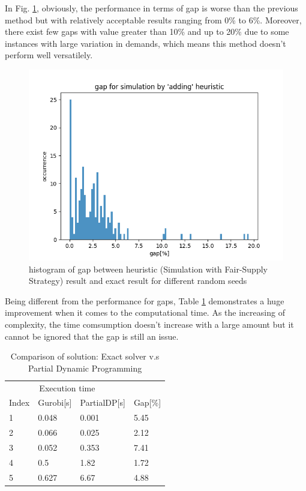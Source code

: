 \documentclass{article}
\begin{document}
In Fig. \ref{fig:hist_so}, obviously, the performance in terms of gap is worse than the previous method but with relatively acceptable results ranging from 0\% to 6\%. Moreover, there exist few gaps with value greater than 10\% and up to 20\% due to some instances with large variation in demands, which means this method doesn't perform well versatilely.

\begin{figure}[ht]
    \centering
    \includegraphics[scale=0.7]{hist_so.png}
    \caption{histogram of gap between heuristic (Simulation with Fair-Supply Strategy) result and exact result for different random seeds}
    \label{fig:hist_so}
\end{figure}

Being different from the performance for gaps, Table \ref{tab:exact_heu2} demonstrates a huge improvement when it comes to the computational time. As the increasing of complexity, the time comsumption doesn't increase with a large amount but it cannot be ignored that the gap is still an issue.

\begin{table}[ht]
 \caption{Comparison of solution: Exact solver v.s Partial Dynamic Programming}
  \centering
  \begin{tabular}{llll}
    \toprule
    \multicolumn{3}{c}{Execution time}                   \\
    \cmidrule(r){2-3}
    Index   & Gurobi[s]     & PartialDP[s]      & Gap[\%] \\
    \midrule
    1	&	0.048	&	0.001	&	5.45	\\
    2	&	0.066	&	0.025	&	2.12	\\
    3	&	0.052	&	0.353	&	7.41	\\
    4	&	0.5	&	1.82	&	1.72	\\
    5	&	0.627	&	6.67	&	4.88	\\
    \bottomrule
  \end{tabular}
  \label{tab:exact_heu2}
\end{table}
\end{document}
